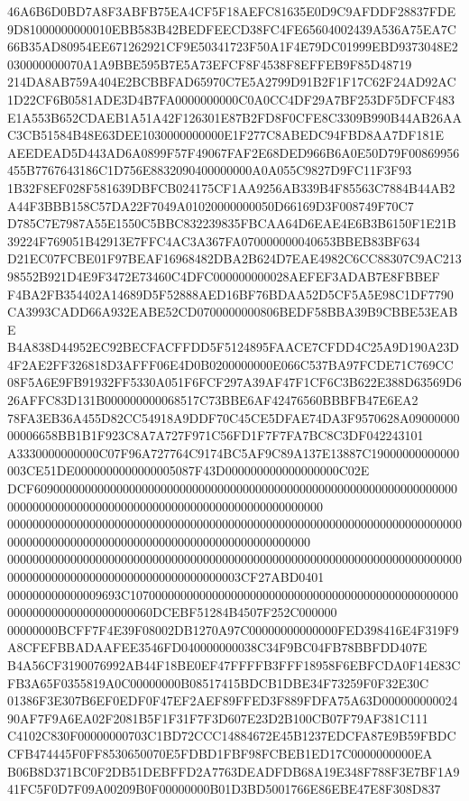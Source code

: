 \documentclass[UTF8,fontset=fandol,zihao=-4,a4paper]{ctexart}
\begin{document}
{{46A6B6D0BD7A8F3ABFB75EA4CF5F18AEFC81635E0D9C9AFDDF28837FDE9D81000000000010EBB583B42BEDFEECD38FC4FE65604002439A536A75EA7C
66B35AD80954EE671262921CF9E50341723F50A1F4E79DC01999EBD9373048E2030000000070A1A9BBE595B7E5A73EFCF8F4538F8EFFEB9F85D48719
214DA8AB759A404E2BCBBFAD65970C7E5A2799D91B2F1F17C62F24AD92AC1D22CF6B0581ADE3D4B7FA0000000000C0A0CC4DF29A7BF253DF5DFCF483
E1A553B652CDAEB1A51A42F126301E87B2FD8F0CFE8C3309B990B44AB26AAC3CB51584B48E63DEE1030000000000E1F277C8ABEDC94FBD8AA7DF181E
AEEDEAD5D443AD6A0899F57F49067FAF2E68DED966B6A0E50D79F00869956455B7767643186C1D756E8832090400000000A0A055C9827D9FC11F3F93
1B32F8EF028F581639DBFCB024175CF1AA9256AB339B4F85563C7884B44AB2A44F3BBB158C57DA22F7049A01020000000050D66169D3F008749F70C7
D785C7E7987A55E1550C5BBC832239835FBCAA64D6EAE4E6B3B6150F1E21B39224F769051B42913E7FFC4AC3A367FA070000000040653BBEB83BF634
D21EC07FCBE01F97BEAF16968482DBA2B624D7EAE4982C6CC88307C9AC21398552B921D4E9F3472E73460C4DFC000000000028AEFEF3ADAB7E8FBBEF
F4BA2FB354402A14689D5F52888AED16BF76BDAA52D5CF5A5E98C1DF7790CA3993CADD66A932EABE52CD0700000000806BEDF58BBA39B9CBBE53EABE
B4A838D44952EC92BECFACFFDD5F5124895FAACE7CFDD4C25A9D190A23D4F2AE2FF326818D3AFFF06E4D0B0200000000E066C537BA97FCDE71C769CC
08F5A6E9FB91932FF5330A051F6FCF297A39AF47F1CF6C3B622E388D63569D626AFFC83D131B000000000068517C73BBE6AF42476560BBBFB47E6EA2
78FA3EB36A455D82CC54918A9DDF70C45CE5DFAE74DA3F9570628A0900000000006658BB1B1F923C8A7A727F971C56FD1F7F7FA7BC8C3DF042243101
A3330000000000C07F96A727764C9174BC5AF9C89A137E13887C19000000000000003CE51DE0000000000000005087F43D000000000000000000C02E
DCF609000000000000000000000000000000000000000000000000000000000000000000000000000000000000000000000000000000000000000000
000000000000000000000000000000000000000000000000000000000000000000000000000000000000000000000000000000000000000000000000
0000000000000000000000000000000000000000000000000000000000000000000000000000000000000000000000000000000000003CF27ABD0401
000000000000009693C107000000000000000000000000000000000000000000000000000000000000000000000060DCEBF51284B4507F252C000000
00000000BCFF7F4E39F08002DB1270A97C00000000000000FED398416E4F319F9A8CFEFBBADAAFEE3546FD040000000038C34F9BC04FB78BBFDD407E
B4A56CF3190076992AB44F18BE0EF47FFFFB3FFF18958F6EBFCDA0F14E83CFB3A65F0355819A0C00000000B08517415BDCB1DBE34F73259F0F32E30C
01386F3E307B6EF0EDF0F47EF2AEF89FFED3F889FDFA75A63D00000000002490AF7F9A6EA02F2081B5F1F31F7F3D607E23D2B100CB07F79AF381C111
C4102C830F00000000703C1BD72CCC14884672E45B1237EDCFA87E9B59FBDCCFB474445F0FF8530650070E5FDBD1FBF98FCBEB1ED17C0000000000EA
B06B8D371BC0F2DB51DEBFFD2A7763DEADFDB68A19E348F788F3E7BF1A941FC5F0D7F09A00209B0F00000000B01D3BD5001766E86EBE47E8F308D837
}}
\end{document}
